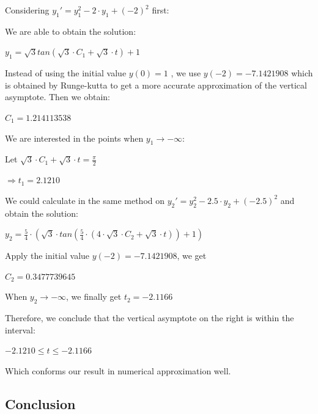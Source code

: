 \documentclass[11pt,a4paper]{article}
\begin{document}
\begin{multicols}{2}
	\noindent Considering $y_1'=y_1^2-2 \cdot y_1+(-2)^2$ first:

	\noindent We are able to obtain the solution: 
	
	\begin{center}
		$y_1=\sqrt{3}tan({\sqrt{3} \cdot C_1+\sqrt{3} \cdot t})+1$
	\end{center}

	\noindent Instead of using the initial value $y(0)=1$ , we use $y(-2)=-7.1421908$ which is obtained by Runge-kutta to get a more accurate approximation of the vertical asymptote. Then we obtain: 
	
	\begin{center}
		$C_1=1.214113538$
	\end{center}

	\noindent We are interested in the points when $y_1 \rightarrow -\infty$:

	\begin{center}
		Let $\sqrt{3} \cdot C_1+\sqrt{3} \cdot t=\frac{\pi}{2}$

		$\Rightarrow t_1 = 2.1210$
	\end{center}

	\noindent We could calculate in the same method on $y_2' = y_2 ^ 2-2.5 \cdot y_2+(-2.5)^2$ and obtain the solution:

	\begin{center}
		$y_2=\frac{5}{4} \cdot (\sqrt{3} \cdot tan(\frac{5}{4} \cdot (4 \cdot \sqrt{3} \cdot C_2+\sqrt{3} \cdot t))+1)$
	\end{center}

	\noindent Apply the initial value $y(-2) = -7.1421908$, we get 
	\begin{center}
		$C_2 = 0.3477739645$
	\end{center}

	\noindent When $y_2 \rightarrow -\infty$, we finally get $t_2=-2.1166$

	\noindent Therefore, we conclude that the vertical asymptote on the right is within the interval:

	\begin{center}
		$-2.1210 \leq t \leq -2.1166$
	\end{center}

	\noindent Which conforms our result in numerical approximation well.

\end{multicols}

\newpage
\subsection{Conclusion}
\end{document}
